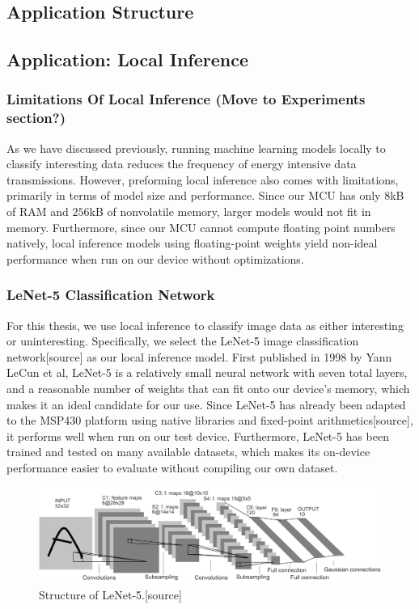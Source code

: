 \documentclass[twoside]{report}
\begin{document}
\subsection{Application Structure}

\subsection{Application: Local Inference}
\subsubsection{Limitations Of Local Inference (Move to Experiments section?)}
As we have discussed previously, running machine learning models locally to classify interesting 
data reduces the frequency of energy intensive data transmissions. 
However, preforming local inference also comes with limitations, 
primarily in terms of model size and performance. Since our MCU has only $8$kB of RAM 
and $256$kB of nonvolatile memory, larger models would not fit in memory. Furthermore, 
since our MCU cannot compute floating point numbers natively, local inference models 
using floating-point weights yield non-ideal performance when run on our device without optimizations.

\subsubsection{LeNet-5 Classification Network}
For this thesis, we use local inference to classify image data as either interesting or uninteresting. 
Specifically, we select the LeNet-5 image classification network[source] as our local inference model. 
First published in 1998 by Yann LeCun et al, LeNet-5 is a relatively small neural network with seven 
total layers, and a reasonable number of weights that can fit onto our device's memory, 
which makes it an ideal candidate for our use. Since LeNet-5 has 
already been adapted to the MSP430 platform using native libraries and fixed-point arithmetics[source], 
it performs well when run on our test device. Furthermore, LeNet-5 has been trained and tested on many 
available datasets, which makes its on-device performance easier to evaluate without compiling our own dataset.

\begin{figure}[ht]
    \centering
    \includegraphics[width=1.0\linewidth]{method/lenet5.png}
    \caption{Structure of LeNet-5.[source]}
    \label{fig:lenet5}
\end{figure}
\end{document}
